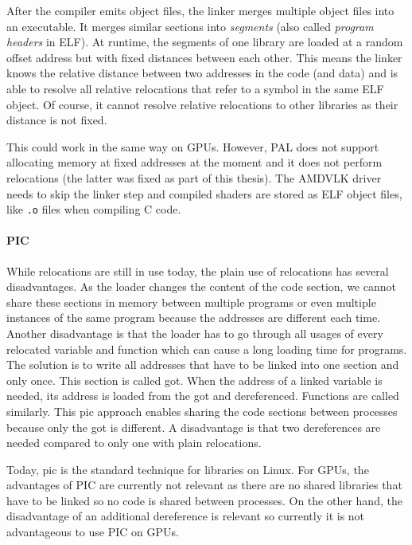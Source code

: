 After the compiler emits object files, the linker merges multiple object files into an executable. It merges similar sections into \emph{segments} (also called \emph{program headers} in ELF). At runtime, the segments of one library are loaded at a random offset address but with fixed distances between each other. This means the linker knows the relative distance between two addresses in the code (and data) and is able to resolve all relative relocations that refer to a symbol in the same ELF object. Of course, it cannot resolve relative relocations to other libraries as their distance is not fixed.

This could work in the same way on GPUs. However, PAL does not support allocating memory at fixed addresses at the moment and it does not perform relocations (the latter was fixed as part of this thesis). The AMDVLK driver needs to skip the linker step and compiled shaders are stored as ELF object files, like \texttt{.o} files when compiling C code.

\paragraph{PIC} While relocations are still in use today, the plain use of relocations has several disadvantages. As the loader changes the content of the code section, we cannot share these sections in memory between multiple programs or even multiple instances of the same program because the addresses are different each time.
Another disadvantage is that the loader has to go through all usages of every relocated variable and function which can cause a long loading time for programs. The solution is to write all addresses that have to be linked into one section and only once. This section is called \gls{got}.
When the address of a linked variable is needed, its address is loaded from the \gls{got} and dereferenced. Functions are called similarly. This \gls{pic} approach enables sharing the code sections between processes because only the \gls{got} is different. A disadvantage is that two dereferences are needed compared to only one with plain relocations.~\cite{BenderskyPic}

Today, \gls{pic} is the standard technique for libraries on Linux. For GPUs, the advantages of PIC are currently not relevant as there are no shared libraries that have to be linked so no code is shared between processes. On the other hand, the disadvantage of an additional dereference is relevant so currently it is not advantageous to use PIC on GPUs.

